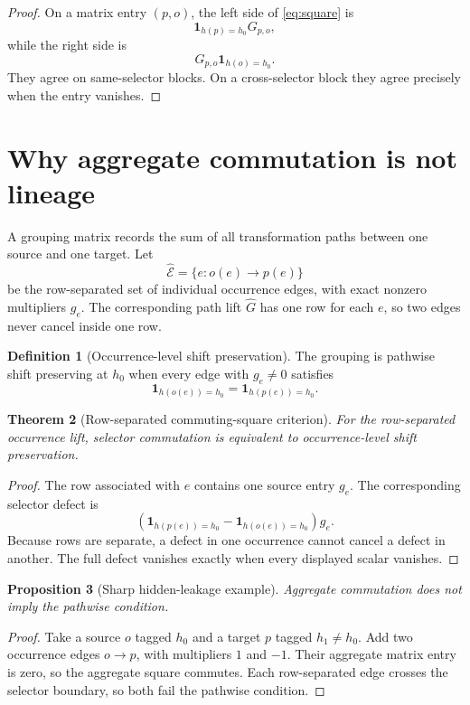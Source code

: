 \documentclass[11pt]{article}
\newtheorem{theorem}{Theorem}[section]
\newtheorem{proposition}[theorem]{Proposition}
\theoremstyle{definition}
\newtheorem{definition}[theorem]{Definition}
\theoremstyle{remark}
\begin{document}
\begin{proof}
On a matrix entry \((p,o)\), the left side of \eqref{eq:square} is
\[
 \mathbf1_{h(p)=h_0}G_{p,o},
\]
while the right side is
\[
 G_{p,o}\mathbf1_{h(o)=h_0}.
\]
They agree on same-selector blocks.  On a cross-selector block they
agree precisely when the entry vanishes.
\end{proof}

\section{Why aggregate commutation is not lineage}

A grouping matrix records the sum of all transformation paths between
one source and one target.  Let
\[
 \widehat{\mathcal E}
 =
 \{e:o(e)\to p(e)\}
\]
be the row-separated set of individual occurrence edges, with exact
nonzero multipliers \(g_e\).  The corresponding path lift
\(\widehat G\) has one row for each \(e\), so two edges never cancel
inside one row.

\begin{definition}[Occurrence-level shift preservation]
The grouping is pathwise shift preserving at \(h_0\) when every edge
with \(g_e\ne0\) satisfies
\[
 \mathbf1_{h(o(e))=h_0}
 =
 \mathbf1_{h(p(e))=h_0}.
\]
\end{definition}

\begin{theorem}[Row-separated commuting-square criterion]
\label{thm:pathwise}
For the row-separated occurrence lift, selector commutation is
equivalent to occurrence-level shift preservation.
\end{theorem}

\begin{proof}
The row associated with \(e\) contains one source entry \(g_e\).
The corresponding selector defect is
\[
 \left(
 \mathbf1_{h(p(e))=h_0}
 -
 \mathbf1_{h(o(e))=h_0}
 \right)g_e.
\]
Because rows are separate, a defect in one occurrence cannot cancel
a defect in another.  The full defect vanishes exactly when every
displayed scalar vanishes.
\end{proof}

\begin{proposition}[Sharp hidden-leakage example]
\label{prop:hidden}
Aggregate commutation does not imply the pathwise condition.
\end{proposition}

\begin{proof}
Take a source \(o\) tagged \(h_0\) and a target \(p\) tagged
\(h_1\ne h_0\).  Add two occurrence edges \(o\to p\), with
multipliers \(1\) and \(-1\).  Their aggregate matrix entry is zero,
so the aggregate square commutes.  Each row-separated edge crosses
the selector boundary, so both fail the pathwise condition.
\end{proof}
\end{document}
